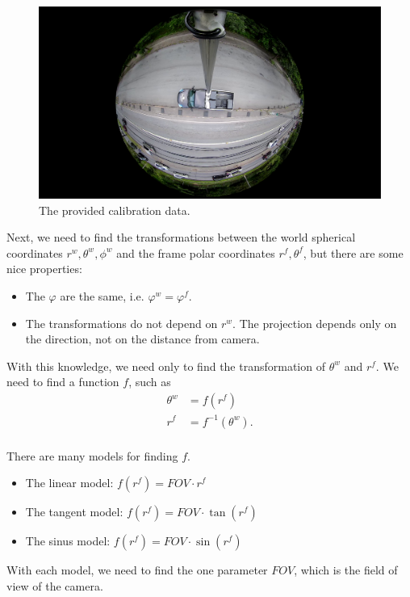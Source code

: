 \documentclass[a4paper,12pt,titlepage, twoside]{article}
\numberwithin{figure}{section}
\begin{document}
\begin{figure}[h!]
\centering
\includegraphics[width=0.7\linewidth]{fig/calibration.png}
\caption{The provided calibration data.}
\label{fig:calibration}
\end{figure}

Next, we need to find the transformations between the world spherical coordinates $r^w, \theta^w, \phi^w$ and the frame polar coordinates $r^f, \theta^f$, but there are some nice properties:

\begin{itemize}
\item The $\varphi$ are the same, i.e. $\varphi^w = \varphi^f$.
\item The transformations do not depend on $r^w$. The projection depends only on the direction, not on the distance from camera.
\end{itemize}

With this knowledge, we need only to find the transformation of $\theta^w$ and $r^f$. We need to find a function $f$, such as 
\begin{equation}
\begin{aligned}
\theta^w &= f(r^f) \\
r^f &= f^{-1}(\theta^w). \\
\end{aligned}
\end{equation}

There are many models for finding $f$. 

\begin{itemize}
\item The linear model: $f(r^f) = FOV \cdot r^f$
\item The tangent model: $f(r^f) = FOV \cdot \tan(r^f)$
\item The sinus model: $f(r^f) = FOV \cdot \sin(r^f)$
\end{itemize}

With each model, we need to find the one parameter $FOV$, which is the field of view of the camera.
\end{document}
